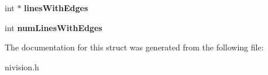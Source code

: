 \begin{DoxyCompactItemize}
\item 
\hypertarget{structConcentricRakeReport__struct_a83e2e046e6f7bb21341e21920f86ef1a}{int $\ast$ {\bfseries lines\-With\-Edges}}\label{structConcentricRakeReport__struct_a83e2e046e6f7bb21341e21920f86ef1a}

\item 
\hypertarget{structConcentricRakeReport__struct_aff464240ebce8196f8add71bc5643991}{int {\bfseries num\-Lines\-With\-Edges}}\label{structConcentricRakeReport__struct_aff464240ebce8196f8add71bc5643991}

\end{DoxyCompactItemize}


\-The documentation for this struct was generated from the following file\-:\begin{DoxyCompactItemize}
\item 
nivision.\-h\end{DoxyCompactItemize}
